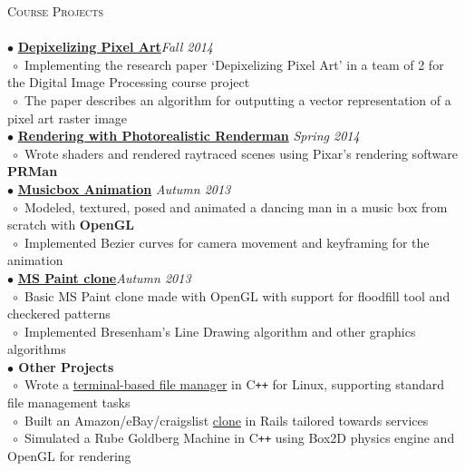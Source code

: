 \documentclass[a4paper,9pt]{article}
\begin{document}
\textcolor{myrust}{\large{\textsc{Course Projects}}}\textcolor{mygray}{\sout{\hfill}}\\\\
\normalsize
\textbf{$\bullet$} \href{https://github.com/wenderen/depixelizing}{\textbf{Depixelizing Pixel Art}}\hfill\textit{Fall 2014}\\
$\;\circ$ Implementing the research paper `Depixelizing Pixel Art' in a team of 2 for the Digital Image Processing course project\\
$\;\circ$ The paper describes an algorithm for outputting a vector representation of a pixel art raster image\\
\textbf{$\bullet$} \href{https://wenderen.github.io/renderman/}{\textbf{Rendering with Photorealistic Renderman}} \hfill \textit{Spring 2014}\\
$\;\circ$ Wrote shaders and rendered raytraced scenes using Pixar's rendering software \textbf{PRMan}\\
\textbf{$\bullet$} \href{https://github.com/wenderen/musicbox}{\textbf{Musicbox Animation}} \hfill \textit{Autumn 2013}\\
$\;\circ$ Modeled, textured, posed and animated a dancing man in a music box from scratch with \textbf{OpenGL}\\
$\;\circ$ Implemented Bezier curves for camera movement and keyframing for the animation\\
\textbf{$\bullet$} \href{https://github.com/wenderen/mydraw}{\textbf{MS Paint clone}}\hfill \textit{Autumn 2013}\\
$\;\circ$ Basic MS Paint clone made with OpenGL with support for floodfill tool and checkered patterns\\
$\;\circ$ Implemented Bresenham's Line Drawing algorithm and other graphics algorithms\\
\textbf{$\bullet$ Other Projects}\\
$\;\circ$ Wrote a \href{https://github.com/wenderen/fmot}{terminal-based file manager} in C\texttt{++} for Linux, supporting standard file management tasks\\
$\;\circ$ Built an Amazon/eBay/craigslist \href{https://github.com/wenderen/service-bazaar}{clone} in Rails tailored towards services\\
$\;\circ$ Simulated a Rube Goldberg Machine in C\verb!++! using Box2D physics engine and OpenGL for rendering\\
\end{document}
